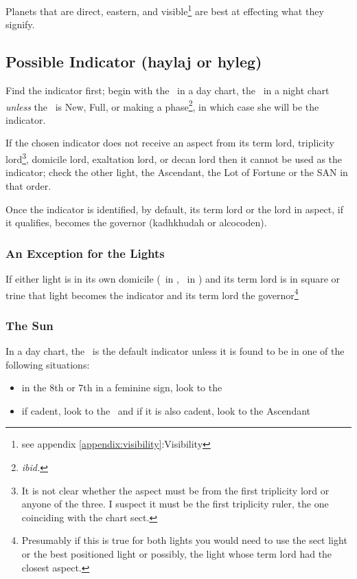Planets that are direct, eastern, and visible\footnote{see appendix \ref{appendix:visibility}:Visibility} are best at effecting what they signify. 

\subsection{Possible Indicator (haylaj or hyleg)}
Find the indicator first; begin with the \Sun\, in a day chart, the \Moon\, in a night chart \textsl{unless} the \Moon\,  is New, Full, or making a phase\footnote{\textsl{ibid.}}, in which case she will be the indicator. 

If  the chosen indicator does not receive an aspect from its term lord, triplicity lord\footnote{It is not clear whether the aspect must be from the first triplicity lord or anyone of the three. I suspect it must be the first triplicity ruler, the one coinciding with the chart sect.}, domicile lord, exaltation lord, or decan lord then it cannot be used as the indicator;  check the other light, the Ascendant, the Lot of Fortune or the SAN in that order.

Once the indicator is identified, by default, its term lord or the lord in aspect, if it qualifies, becomes the governor (kadhkhudah or alcocoden).

\subsubsection{An Exception for the Lights}
If either light is in its own domicile (\Sun\, in \Leo, \Moon\, in \Cancer) and its term lord is in square or trine that light becomes the indicator and its term lord the governor\footnote{Presumably if this is true for both lights you would need to use the sect light or the best positioned light or possibly, the light whose term lord had the closest aspect.}

\subsubsection{The Sun}
In a day chart, the \Sun\, is the default indicator unless it is found to be in one of the following situations:
\vspace{-0.5em}
\begin{itemize}[topsep=0em,itemsep=0em]
\item {}in the 8th or 7th in a feminine sign, look to the \Moon
\item {}if cadent, look to the \Moon\, and if it is also cadent, look to the Ascendant
\end{itemize}


